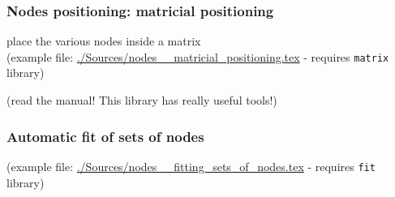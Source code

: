 \begin{frame}
	\frametitle{Nodes positioning: matricial positioning}
	place the various nodes inside a matrix \\
	(example file: \url{./Sources/nodes__matricial_positioning.tex} - requires \texttt{matrix} library)
	
	(read the manual! This library has \alert{really useful tools}!)
\end{frame}

 




\begin{frame}
	\frametitle{Automatic fit of sets of nodes}
	(example file: \url{./Sources/nodes__fitting_sets_of_nodes.tex} - requires \texttt{fit} library)
	
\end{frame}



